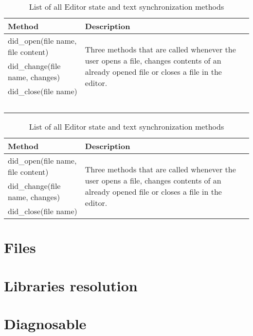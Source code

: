 \begin{table}
	\centering
	\begin{tabular}{ll}
		
		\toprule
		Method & Description \\ \midrule
		did\_open(file name, file content) & \multirow{3}{8cm}{Three methods that are called whenever the user opens a file, changes contents of an already opened file or closes a file in the editor.} \\
		did\_change(file name, changes)& \\
		did\_close(file name)& \\
		\
	\end{tabular}
	
	\caption{List of all Editor state and text synchronization methods}
	\label{text_sync_methods}
\end{table}

\begin{table}
	\centering
	\begin{tabular}{ll}
		
		\toprule
		Method & Description \\ \midrule
		did\_open(file name, file content) & \multirow{3}{8cm}{Three methods that are called whenever the user opens a file, changes contents of an already opened file or closes a file in the editor.} \\
		did\_change(file name, changes)& \\
		did\_close(file name)& \\
	\end{tabular}
	
	\caption{List of all Editor state and text synchronization methods}
	\label{text_sync_methods}
\end{table}

\section{Files}

\section{Libraries resolution}

\section{Diagnosable}